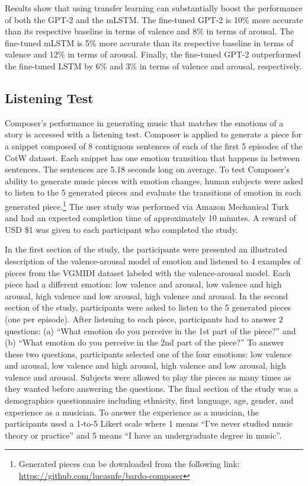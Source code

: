 Results show that using transfer learning can substantially boost the performance of both the GPT-2 and the mLSTM. The fine-tuned GPT-2 is 10\% more accurate than its respective baseline in terms of valence and 8\% in terms of arousal. The fine-tuned mLSTM is 5\% more accurate than its respective baseline in terms of valence and 12\% in terms of arousal. Finally, the fine-tuned GPT-2 outperformed the fine-tuned LSTM by 6\% and 3\% in terms of valence and arousal, respectively.

\subsection{Listening Test}

Composer's performance in generating music that matches the emotions of a story is accessed with a listening test. Composer is applied to generate a piece for a snippet composed of 8 contiguous sentences of each of the first 5 episodes of the CotW dataset. Each snippet has one emotion transition that happens in between sentences. The sentences are 5.18 seconds long on average. To test Composer's ability to generate music pieces with emotion changes, human subjects were asked to listen to the 5 generated pieces and evaluate the transitions of emotion in each generated piece.\footnote{Generated pieces can be downloaded from the following link: \url{https://github.com/lucasnfe/bardo-composer}} The user study was performed via Amazon Mechanical Turk and had an expected completion time of approximately 10 minutes. A reward of USD \$1 was given to each participant who completed the study.

In the first section of the study, the participants were presented an illustrated description of the valence-arousal model of emotion and listened to 4 examples of pieces from the VGMIDI dataset labeled with the valence-arousal model. Each piece had a different emotion: low valence and arousal, low valence and high arousal, high valence and low arousal, high valence and arousal. In the second section of the study, participants were asked to listen to the 5 generated pieces (one per episode). After listening to each piece, participants had to answer 2 questions: (a) ``What emotion do you perceive in the 1st part of the piece?'' and (b) ``What emotion do you perceive in the 2nd part of the piece?'' To answer these two questions, participants selected one of the four emotions: low valence and arousal, low valence and high arousal, high valence and low arousal, high valence and arousal. Subjects were allowed to play the pieces as many times as they wanted before answering the questions.
The final section of the study was a demographics questionnaire including ethnicity, first language, age, gender, and experience as a musician. To answer the experience as a musician, the participants used a 1-to-5 Likert scale where 1 means ``I've never studied music theory or practice'' and 5 means ``I have an undergraduate degree in music''.

